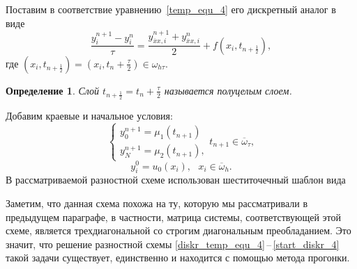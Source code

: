 \documentclass[11pt,a4paper,twoside]{report}
\numberwithin{equation}{section}
\newtheorem*{definition}{Определение}
\theoremstyle{definition}
\theoremstyle{plain}
\begin{document}
Поставим в соответствие уравнению~\eqref{temp_equ_4} его дискретный аналог
в виде
%
\begin{equation}
%
    \label{diskr_temp_equ_4}
    \frac{y_i^{n+1} - y_i^n}{\tau} = \frac{y_{\overline{x}x, i}^{n+1} +
    y_{\overline{x}x, i}^n}{2} + f(x_i, t_{n+\frac12}),
%
\end{equation}
%
где $(x_i, t_{n+\frac12}) = \left(x_i, t_{n} + \frac{\tau}{2}\right) \in \omega_{h \tau}$.
%
\begin{definition}
%
    Слой $t_{n+\frac12} = t_{n} + \frac{\tau}{2}$ называется полуцелым слоем.
%
\end{definition}
%
%
Добавим краевые и начальное условия:
%
\begin{equation}
%
    \label{bord_diskr_4}
    \begin{cases}
        y_0^{n+1} = \mu_1(t_{n+1}) \\
        y_N^{n+1} = \mu_2(t_{n+1}),
    \end{cases}
    t_{n+1}\in \overline{\omega}_{\tau},
%
\end{equation}
%
%
\begin{equation}
%
    \label{start_diskr_4}
    y_i^0 = u_0(x_i),~~~x_i\in \overline{\omega}_h.
%
\end{equation}
%
В рассматриваемой разностной схеме использован шеститочечный шаблон вида
%
\begin{figure}[H]
\centering
{}
\end{figure}
%

Заметим, что данная схема похожа на ту, которую мы рассматривали
в предыдущем параграфе, в частности, матрица системы,
соответствующей этой схеме, является
трехдиагональной со строгим диагональным преобладанием.
Это значит, что решение разностной схемы
\eqref{diskr_temp_equ_4}\,--\,\eqref{start_diskr_4} такой
задачи существует, единственно и находится с помощью метода прогонки.
\end{document}
